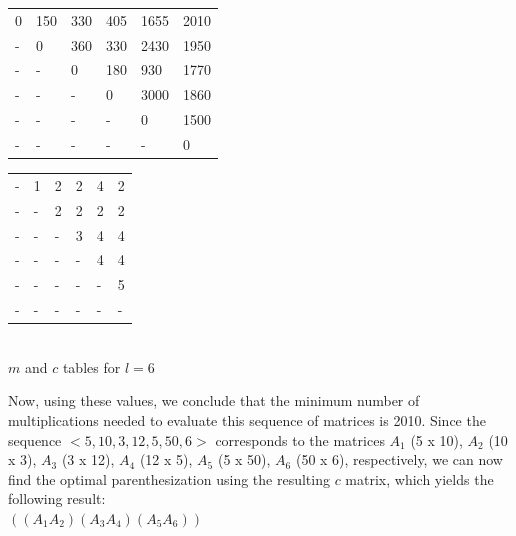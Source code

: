 \documentclass[11pt]{article}
\begin{document}
\begin{sol}
{%
	\centering
	\begin{tabular}{|l|l|l|l|l|l|}
		 \hline
        0 & 150 & 330 & 405 & 1655 & 2010 \\ 
        - & 0 & 360 &330 & 2430 & 1950 \\ 
        - & - & 0 & 180 & 930 & 1770 \\ 
        - & - & - & 0 & 3000 & 1860\\ 
        - & - & - & - & 0 & 1500  \\ 
        - & - & - & - & - & 0 \\
        \hline
	\end{tabular}
	\hspace{20mm}
	\begin{tabular}{|l|l|l|l|l|l|}
		 \hline
        - & 1 & 2 & 2 & 4 & 2 \\ 
        - & - & 2 & 2 & 2 & 2 \\ 
        - & - & - & 3 & 4 & 4 \\ 
        - & - & - & - & 4 & 4 \\ 
        - & - & - & - & - & 5 \\ 
        - & - & - & - & - & - \\
        \hline
	\end{tabular} \\ 
\vspace{0.5cm}
$m$ and $c$ tables for $l = 6$\\ 
\vspace{0.5cm}
}

Now, using these values, we conclude that the minimum number of multiplications needed to evaluate this sequence of matrices is 2010. Since the sequence $<5, 10, 3, 12, 5, 50, 6>$ corresponds to the matrices $A_1$ (5 x 10), $A_2$ (10 x 3), $A_3$ (3 x 12), $A_4$ (12 x 5), $A_5$ (5 x 50), $A_6$ (50 x 6), respectively, we can now find the optimal parenthesization using the resulting $c$ matrix, which yields the following result: \\ 

$((A_1A_2)(A_3A_4)(A_5A_6))$

\end{sol}
\end{document}

